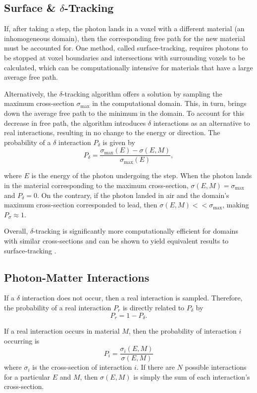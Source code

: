 \subsection{Surface \& $\delta$-Tracking}

\par If, after taking a step, the photon lands in a voxel with a different material (an inhomogeneous domain), then the corresponding free path for the new material must be accounted for. One method, called surface-tracking, requires photons to be stopped at voxel boundaries and intersections with surrounding voxels to be calculated, which can be computationally intensive for materials that have a large average free path. 
\par Alternatively, the $\delta$-tracking algorithm offers a solution by sampling the maximum cross-section $\sigma_{\text{max}}$ in the computational domain. This, in turn, brings down the average free path to the minimum in the domain. To account for this decrease in free path, the algorithm introduces $\delta$ interactions as an alternative to real interactions, resulting in no change to the energy or direction. The probability of a $\delta$ interaction $P_{\delta}$ is given by 
\begin{equation}
    P_{\delta} = \frac{\sigma_{\text{max}}(E) - \sigma(E, M)}{\sigma_{\text{max}}(E)},
\end{equation}

where $E$ is the energy of the photon undergoing the step. When the photon lands in the material corresponding to the maximum cross-section, $\sigma(E, M) = \sigma_{\text{max}}$ and $P_{\delta} = 0$. On the contrary, if the photon landed in air and the domain's maximum cross-section corresponded to lead, then $\sigma(E, M) << \sigma_{\text{max}}$, making $P_{\sigma} \approx 1$.

\par Overall, $\delta$-tracking is significantly more computationally efficient for domains with similar cross-sections and can be shown to yield equivalent results to surface-tracking \cite{vassiliev_monte_2017}.

\subsection{Photon-Matter Interactions}
\par If a $\delta$ interaction does not occur, then a real interaction is sampled. Therefore, the probability of a real interaction $P_r$ is directly related to $P_\delta$ by
\begin{equation}
    P_r = 1 - P_\delta.
\end{equation}
\par If a real interaction occurs in material $M$, then the probability of interaction $i$ occurring is 
\begin{equation}
P_i = \frac{\sigma_i(E, M)}{\sigma (E, M)}
\end{equation}
where $\sigma_i$ is the cross-section of interaction $i$. If there are $N$ possible interactions for a particular $E$ and $M$, then $\sigma (E, M)$ is simply the sum of each interaction's cross-section.

